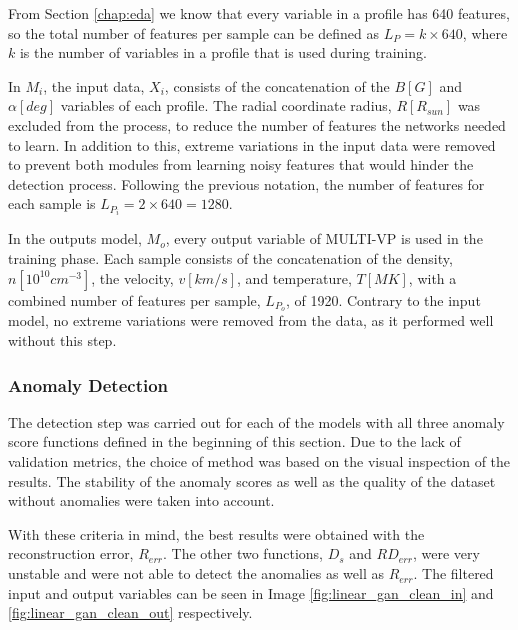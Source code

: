 From Section \ref{chap:eda} we know that every variable in a profile has 640 features, so the total number of features per sample can be defined as $L_P = k\times 640$, where $k$ is the number of variables in a profile that is used during training. 

In $M_i$, the input data, $X_i$, consists of the concatenation of the $B [G]$ and $\alpha [deg]$ variables of each profile. The radial coordinate radius, $R [R_{sun}]$ was excluded from the process, to reduce the number of features the networks needed to learn. In addition to this, extreme variations in the input data were removed to prevent both modules from learning noisy features that would hinder the detection process. Following the previous notation, the number of features for each sample is $L_{P_i} = 2\times 640 = 1280$.

In the outputs model, $M_o$, every output variable of MULTI-VP is used in the training phase. Each sample consists of the concatenation of the density, $n [10^{10}cm^{-3}]$,  the velocity, $v [km/s]$, and temperature, $T [MK]$, with a combined number of features per sample, $L_{P_o}$, of 1920. Contrary to the input model, no extreme variations were removed from the data, as it performed well without this step.

\subsubsection*{Anomaly Detection}
The detection step was carried out for each of the models with all three anomaly score functions defined in the beginning of this section. Due to the lack of validation metrics, the choice of method was based on the visual inspection of the results. The stability of the anomaly scores as well as the quality of the dataset without anomalies were taken into account.

With these criteria in mind, the best results were obtained with the reconstruction error, $R_{err}$. The other two functions, $D_{s}$ and $RD_{err}$, were very unstable and were not able to detect the anomalies as well as $R_{err}$. The filtered input and output variables can be seen in Image \ref{fig:linear_gan_clean_in} and \ref{fig:linear_gan_clean_out} respectively.


